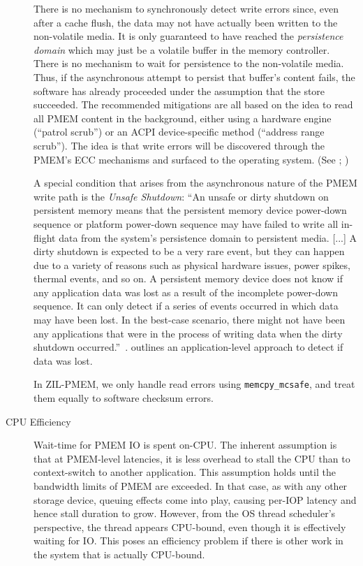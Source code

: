 \documentclass[12pt,a4paper,twoside]{book}
\begin{document}
\begin{description}
        There is no mechanism to synchronously detect write errors since, even after a cache flush, the data may not have actually been written to the non-volatile media.
        It is only guaranteed to have reached the \textit{persistence domain} which may just be a volatile buffer in the memory controller.
        There is no mechanism to wait for persistence to the non-volatile media.
        Thus, if the asynchronous attempt to persist that buffer's content fails, the software has already proceeded under the assumption that the store succeeded.
        The recommended mitigations are all based on the idea to read all PMEM content in the background, either using a hardware engine (``patrol scrub'') or an ACPI device-specific method (``address range scrub'').
        The idea is that write errors will be discovered through the PMEM's ECC mechanisms and surfaced to the operating system.
        (See \cite{ReliabilityAvailabilityServiceability}; \cite[Chapter 17]{Scargall2020})

        A special condition that arises from the asynchronous nature of the PMEM write path is the \textit{Unsafe Shutdown}:
        ``An unsafe or dirty shutdown on persistent memory means that the persistent memory
        device power-down sequence or platform power-down sequence may have failed
        to write all in-flight data from the system’s persistence domain to persistent media.
        [...] A dirty shutdown is expected to be a very
        rare event, but they can happen due to a variety of reasons such as physical hardware
        issues, power spikes, thermal events, and so on.
        A persistent memory device does not know if any application data was lost as a result
        of the incomplete power-down sequence. It can only detect if a series of events occurred
        in which data may have been lost. In the best-case scenario, there might not have been
        any applications that were in the process of writing data when the dirty shutdown
        occurred.''~\cite[Chapter 17]{Scargall2020}.
        \citeauthor{Scargall2020}\cite{Scargall2020} outlines an application-level approach to detect if data was lost.

        In ZIL-PMEM, we only handle read errors using \lstinline{memcpy_mcsafe}, and treat them equally to software checksum errors.

    \item[CPU Efficiency] Wait-time for PMEM IO is spent on-CPU.
        The inherent assumption is that at PMEM-level latencies, it is less overhead to stall the CPU than to context-switch to another application.
        This assumption holds until the bandwidth limits of PMEM are exceeded.
        In that case, as with any other storage device, queuing effects come into play, causing per-IOP latency and hence stall duration to grow.
        However, from the OS thread scheduler's perspective, the thread appears CPU-bound, even though it is effectively waiting for IO.
        This poses an efficiency problem if there is other work in the system that is actually CPU-bound.


\end{description}
\end{document}
